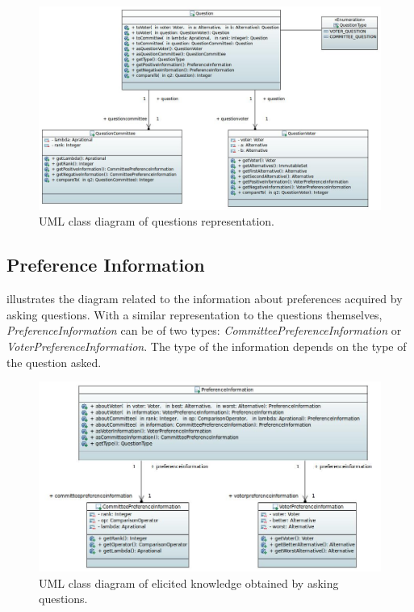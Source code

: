 \begin{figure}
	\centering
	\includegraphics[width=\textwidth]{uml/questions.jpeg}
	\caption{UML class diagram of questions representation.}
	\label{uml:questions}
\end{figure}

\subsection{Preference Information}

 illustrates the diagram related to the information about preferences acquired by asking questions. With a similar representation to the questions themselves, \textit{PreferenceInformation} can be of two types: \textit{CommitteePreferenceInformation} or \textit{VoterPreferenceInformation}. The type of the information depends on the type of the question asked.

\begin{figure}
	\centering
	\includegraphics[width=\textwidth]{uml/prefinfo.jpeg}
	\caption{UML class diagram of elicited knowledge obtained by asking questions.}
	\label{uml:prefinfo}
\end{figure}

